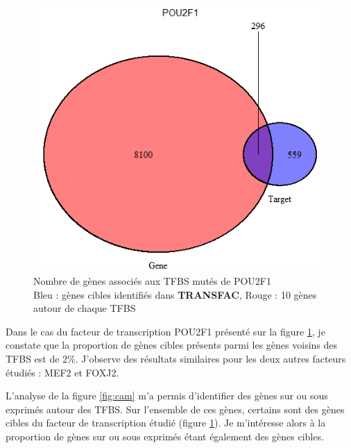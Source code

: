 \begin{figure}[h]
\centering
\includegraphics[scale=0.6]{Figures/POU2F1.png}
\captionsetup{justification=centering}
\caption{Nombre de gènes associés aux TFBS mutés de POU2F1 \\ Bleu : gènes cibles identifiés dans \textbf{TRANSFAC}, Rouge : 10 gènes autour de chaque TFBS}
\label{fig:pou}
\end{figure}


Dans le cas du facteur de transcription POU2F1 présenté sur la figure \ref{fig:pou}, je constate que la proportion de gènes cibles présents parmi les gènes voisins des TFBS est de 2\%. J'observe des résultats similaires pour les deux autres facteurs étudiés : MEF2 et FOXJ2.

L'analyse de la figure \ref{fig:cam} m'a permis d'identifier des gènes sur ou sous exprimés autour des TFBS. Sur l'ensemble de ces gènes, certains sont des gènes cibles du facteur de transcription étudié (figure \ref{fig:pou}). Je m'intéresse alors à la proportion de gènes sur ou sous exprimés étant également des gènes cibles.

